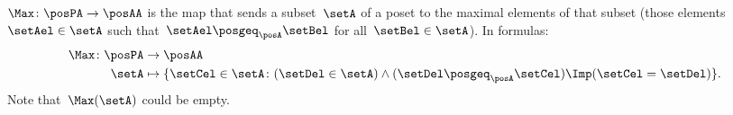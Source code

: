 \begin{definition}[Max]
	\label{def:Max}
	$\Max \colon \posPA \to \posAA$ is the map that sends a subset~$\setA$ of a poset to the maximal elements of that subset (those elements~$\setAel \in \setA$ such that~$\setAel \posgeq_\posA \setBel$ for all~$\setBel \in \setA$).
	In formulas:
	\begin{equation*}
		\begin{aligned}
			\Max \colon \posPA & \to \posAA                                                                                                        \\
			\setA              & \mapsto \{ \setCel\in \setA\colon (\setDel\in \setA)\wedge(\setDel\posgeq_\posA \setCel)\Imp (\setCel=\setDel)\}.
		\end{aligned}
	\end{equation*}
	Note that~$\Max(\setA)$ could be empty.
\end{definition}
%
%
%
